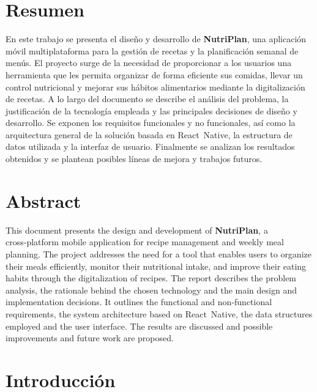\documentclass[twoside, openright, 11pt]{report}
\begin{document}
\chapter*{Resumen}
\thispagestyle{empty}
En este trabajo se presenta el diseño y desarrollo de \textbf{NutriPlan}, una aplicación móvil multiplataforma para la gestión de recetas y la planificación semanal de menús. El proyecto surge de la necesidad de proporcionar a los usuarios una herramienta que les permita organizar de forma eficiente sus comidas, llevar un control nutricional y mejorar sus hábitos alimentarios mediante la digitalización de recetas. A lo largo del documento se describe el análisis del problema, la justificación de la tecnología empleada y las principales decisiones de diseño y desarrollo. Se exponen los requisitos funcionales y no funcionales, así como la arquitectura general de la solución basada en React Native, la estructura de datos utilizada y la interfaz de usuario. Finalmente se analizan los resultados obtenidos y se plantean posibles líneas de mejora y trabajos futuros.

\chapter*{Abstract}
\thispagestyle{empty}
This document presents the design and development of \textbf{NutriPlan}, a cross‑platform mobile application for recipe management and weekly meal planning. The project addresses the need for a tool that enables users to organize their meals efficiently, monitor their nutritional intake, and improve their eating habits through the digitalization of recipes. The report describes the problem analysis, the rationale behind the chosen technology and the main design and implementation decisions. It outlines the functional and non‑functional requirements, the system architecture based on React Native, the data structures employed and the user interface. The results are discussed and possible improvements and future work are proposed.

\tableofcontents

\cleardoublepage
{}
\listoffigures

\cleardoublepage
{}
\listoftables

\chapter{Introducción}\label{cap.introduccion}
\end{document}
